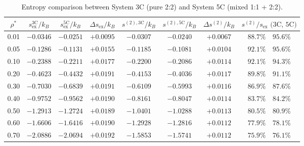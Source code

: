 \documentclass[11pt,a4paper]{article}
\begin{document}
\begin{table}[htbp]
\centering
\caption{Entropy comparison between System 3C (pure 2:2) and System 5C (mixed 1:1 + 2:2).}
\label{tab:entropy_comparison}
\small
\begin{tabular}{cccccccc}
\toprule
$\rho^*$ & $s_{\text{ex}}^{\text{3C}}/k_B$ & $s_{\text{ex}}^{\text{5C}}/k_B$ & $\Delta s_{\text{ex}}/k_B$ & $s^{(2),\text{3C}}/k_B$ & $s^{(2),\text{5C}}/k_B$ & $\Delta s^{(2)}/k_B$ & $s^{(2)}/s_{\text{ex}}\text{ (3C, 5C)}$ \\
\midrule
0.01 & $-0.0346$ & $-0.0251$ & $+0.0095$ & $-0.0307$ & $-0.0240$ & $+0.0067$ & $88.7\% \quad 95.6\%$ \\
0.05 & $-0.1286$ & $-0.1131$ & $+0.0155$ & $-0.1185$ & $-0.1081$ & $+0.0104$ & $92.1\% \quad 95.6\%$ \\
0.10 & $-0.2388$ & $-0.2211$ & $+0.0177$ & $-0.2200$ & $-0.2086$ & $+0.0114$ & $92.1\% \quad 94.3\%$ \\
0.20 & $-0.4623$ & $-0.4432$ & $+0.0191$ & $-0.4153$ & $-0.4036$ & $+0.0117$ & $89.8\% \quad 91.1\%$ \\
0.30 & $-0.7030$ & $-0.6839$ & $+0.0191$ & $-0.6109$ & $-0.5993$ & $+0.0116$ & $86.9\% \quad 87.6\%$ \\
0.40 & $-0.9752$ & $-0.9562$ & $+0.0190$ & $-0.8161$ & $-0.8047$ & $+0.0114$ & $83.7\% \quad 84.2\%$ \\
0.50 & $-1.2913$ & $-1.2724$ & $+0.0189$ & $-1.0401$ & $-1.0288$ & $+0.0113$ & $80.5\% \quad 80.9\%$ \\
0.60 & $-1.6606$ & $-1.6416$ & $+0.0190$ & $-1.2928$ & $-1.2816$ & $+0.0112$ & $77.9\% \quad 78.1\%$ \\
0.70 & $\mathbf{-2.0886}$ & $\mathbf{-2.0694}$ & $\mathbf{+0.0192}$ & $\mathbf{-1.5853}$ & $\mathbf{-1.5741}$ & $\mathbf{+0.0112}$ & $\mathbf{75.9\% \quad 76.1\%}$ \\
\bottomrule
\end{tabular}
\end{table}
\end{document}
